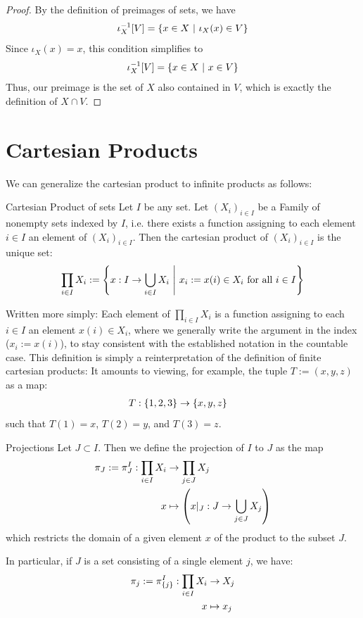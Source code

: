 \begin{proof}
	By the definition of preimages of sets, we have
	\begin{align*}
		\iota_X^{-1}[V] = \qty{x \in X ~\middle|~\iota_X(x) \in V}
	\end{align*}
	Since $\iota_X(x) = x$, this condition simplifies to
	\begin{align*}
		\iota_X^{-1}[V] = \qty{x \in X ~\middle|~x \in V}
	\end{align*}
	Thus, our preimage is the set of $X$ also contained in $V$, which is exactly the definition of $X \cap V$.	
\end{proof}
\section{Cartesian Products}
We can generalize the cartesian product to infinite products as follows:
\begin{importantdefinition}{Cartesian Product of sets}{}
	Let $I$ be any set. Let $(X_i)_{i \in I}$ be a Family of nonempty sets indexed by $I$, i.e. there exists a function assigning to each element $i \in I$ an element of $(X_i)_{i \in I}$. Then the cartesian product of $(X_i)_{i \in I}$ is the unique set:
	\begin{align*}
		\prod_{i \in I} X_i := \qty{x : I \to \bigcup_{i \in I} X_i ~\middle|~x_i := x(i) \in X_i \textnormal{ for all } i \in I}
	\end{align*}
\end{importantdefinition}
Written more simply: Each element of $\prod_{i \in I} X_i$ is a function assigning to each $i \in I$ an element $x(i) \in X_i$, where we generally write the argument in the index ($x_i := x(i)$), to stay consistent with the established notation in the countable case. 
\newpar
This definition is simply a reinterpretation of the definition of finite cartesian products: It amounts to viewing, for example, the tuple $ T := (x,y,z)$ as a map:
\begin{align*}
	T : \qty{1,2,3} &\to \qty{x,y,z}
\end{align*}
such that $T(1) = x$, $T(2) = y$, and $T(3) = z$. 
\begin{importantdefinition}{Projections}{}
	Let $J \subset I$. Then we define the projection of $I$ to $J$ as the map
	\begin{align*}
		\pi_J := \pi_{J}^I : \prod_{i \in I} X_i &\to \prod_{j \in J} X_j\\
		x &\mapsto \qty(x|_J : J \to \bigcup_{j \in J} X_j)
	\end{align*}
	which restricts the domain of a given element $x$ of the product to the subset $J$.
\end{importantdefinition}
In particular, if $J$ is a set consisting of a single element $j$, we have:
\begin{align*}
	\pi_j := \pi_{\qty{j}}^I : \prod_{i \in I} X_i &\to X_j\\
	x &\mapsto x_j
\end{align*}
